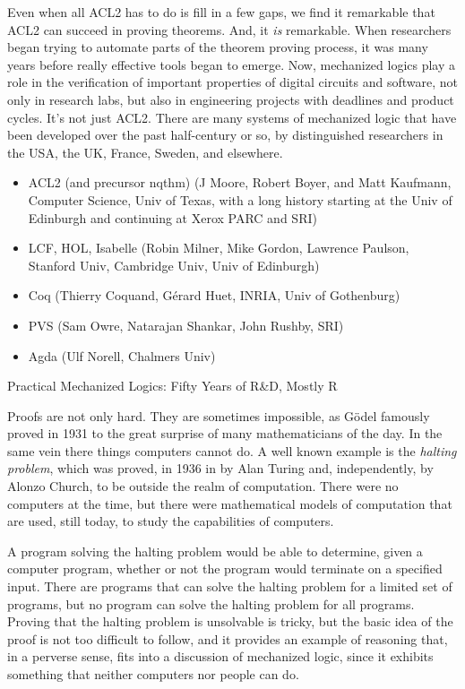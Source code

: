 Even when all ACL2 has to do is fill in a few gaps,
we find it remarkable that ACL2 can succeed in proving theorems.
And, it \emph{is} remarkable.
When researchers began trying to automate parts
of the theorem proving process, it was many years
before really effective tools began to emerge.
Now, mechanized logics play a role in
the verification of important properties of digital circuits and
software, not only in research labs,
but also in engineering projects with deadlines and product cycles.
It's not just ACL2. There are many systems of mechanized logic that
have been developed over the past half-century or so,
by distinguished researchers in the USA, the UK, France, Sweden, and elsewhere.

\begin{aside}
\begin{itemize}
\item ACL2 (and precursor nqthm) (J Moore, Robert Boyer, and Matt Kaufmann, Computer Science, Univ of Texas, with a long history starting at the Univ of Edinburgh and continuing at Xerox PARC and SRI)
\item LCF, HOL, Isabelle (Robin Milner, Mike Gordon, Lawrence Paulson, Stanford Univ, Cambridge Univ, Univ of Edinburgh)
\item Coq (Thierry Coquand, G\'erard Huet, INRIA, Univ of Gothenburg)
\item PVS (Sam Owre, Natarajan Shankar, John Rushby, SRI)
\item Agda (Ulf Norell, Chalmers Univ)
\end{itemize}
\caption{Practical Mechanized Logics: Fifty Years of R\&D, Mostly R}
\label{mechanized-logic-history}
\end{aside}

Proofs are not only hard.
They are sometimes impossible, as G\"odel famously proved in 1931
to the great surprise of many mathematicians of the day.
In the same vein there things computers cannot do.
A well known example is the \emph{halting problem}, which
was proved,
in 1936 in by Alan Turing
and, independently, by Alonzo Church,
to be outside the realm of computation.
There were no computers at the time,
but there were mathematical models of computation
that are used, still today, to study the capabilities of computers.

A program solving the halting problem would be able to determine,
given a computer program, whether or not the program would terminate
on a specified input.
There are programs that can solve the halting problem for
a limited set of programs,
but no program can solve the halting problem for all programs.
Proving that the halting problem is unsolvable is tricky,
but the basic idea of the proof is not too difficult to follow, and
it provides an example of reasoning that,
in a perverse sense, fits into a discussion of mechanized logic,
since it exhibits something that neither computers
nor people can do.

